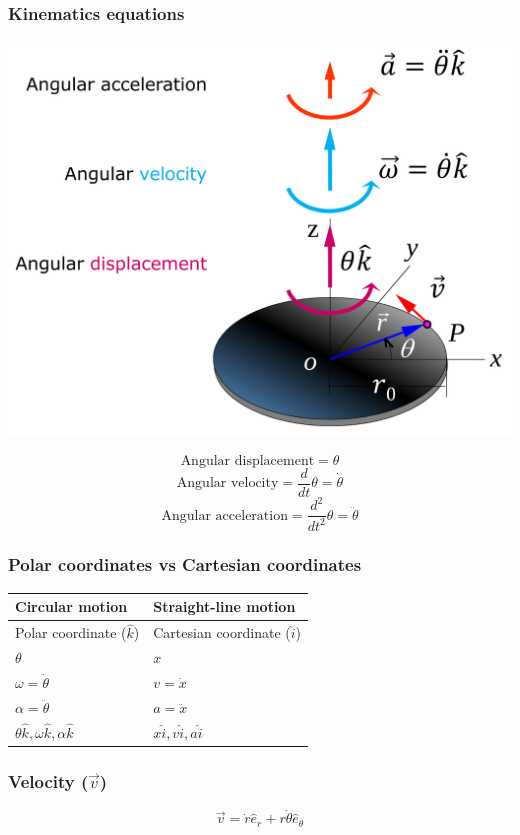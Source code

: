 \documentclass[11pt]{article}
\begin{document}
\subsubsection{Kinematics equations}
\label{sec:orgda1ad95}
\begin{center}
\includegraphics[width=.9\linewidth]{./images/polar-coordinates-kinematics-equations.png}
\end{center}
\[\text{Angular displacement} = \theta\]
\[\text{Angular velocity} = \frac{d}{dt} \theta = \dot{\theta}\]
\[\text{Angular acceleration} = \frac{d^2}{dt^2} \theta = \ddot{\theta}\]
\subsubsection{Polar coordinates vs Cartesian coordinates}
\label{sec:org970962a}
\begin{center}
\begin{tabular}{l|l}
Circular motion & Straight-line motion\\
\hline
Polar coordinate (\(\hat{k}\)) & Cartesian coordinate (\(\hat{i}\))\\
\(\theta\) & \(x\)\\
\(\omega = \dot{\theta}\) & \(v = \dot{x}\)\\
\(\alpha = \ddot{\theta}\) & \(a = \ddot{x}\)\\
\(\theta \hat{k}, \omega \hat{k}, \alpha \hat{k}\) & \(x \hat{i}, v \hat{i}, a \hat{i}\)\\
\end{tabular}
\end{center}

 \newpage
\subsubsection{Velocity (\(\vec{v}\))}
\label{sec:org0cc0c1f}
\[\vec{v} = \dot{r} \hat{e}_r + r \dot{\theta} \hat{e}_{\theta}\]
\end{document}
